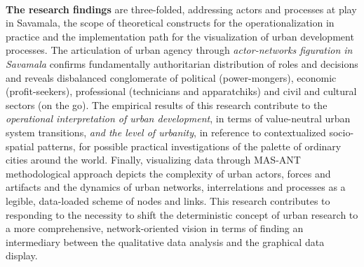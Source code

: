 \documentclass[11pt]{report}
\begin{document}
\\
\textbf{The research findings} are three-folded, addressing actors and processes at play in Savamala, the scope of theoretical constructs for the operationalization in practice and the implementation path for the visualization of urban development processes.
The articulation of urban agency through \textit{actor-networks figuration in Savamala} confirms fundamentally authoritarian distribution of roles and decisions and reveals disbalanced conglomerate of  political (power-mongers), economic (profit-seekers), professional (technicians and apparatchiks) and civil and cultural sectors (on the go).
The empirical results of this research contribute to the \textit{operational interpretation of urban development}, in terms of value-neutral urban system transitions, \textit{and the level of urbanity}, in reference to contextualized socio-spatial patterns, for possible practical investigations of the palette of ordinary cities around the world.
Finally, visualizing data through MAS-ANT methodological approach depicts the complexity of urban actors, forces and artifacts and the dynamics of urban networks, interrelations and processes as a legible, data-loaded scheme of nodes and links. 
This research contributes to responding to the necessity to shift the deterministic concept of  urban research to a more comprehensive, network-oriented vision in terms of finding an intermediary between the qualitative data analysis and the graphical data display.

\cleardoublepage
\end{document}

